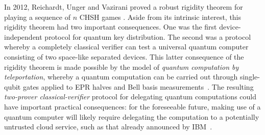 \documentclass[11pt,letter]{article}
\theoremstyle{remark}
\theoremstyle{definition}
\begin{document}
In 2012, Reichardt, Unger and Vazirani proved a robust rigidity theorem for playing a sequence of $n$ CHSH games \cite{reichardt2012classical}. Aside from its intrinsic interest, this rigidity theorem had two important consequences. One was the first device-independent protocol for quantum key distribution. The second was a protocol whereby a completely classical verifier can test a universal quantum computer consisting of two space-like separated devices. This latter consequence of the rigidity theorem is made possible by the model of  \emph{quantum computation by teleportation}, whereby a quantum computation can be carried out through single-qubit gates applied to EPR halves and Bell basis measurements~\cite{gottesman1999teleportation}. The resulting \emph{two-prover classical-verifier} protocol for delegating quantum computations could have important practical consequences: for the foreseeable future, making use of a quantum computer will likely require delegating the computation to a potentially untrusted cloud service, such as that already announced by IBM~\cite{ibmcloud}.  
\end{document}
